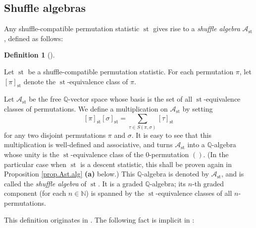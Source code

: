 \documentclass[numbers=enddot,12pt,final,onecolumn,notitlepage]{scrartcl}%
\theoremstyle{definition}
\newtheorem{defi}[theo]{Definition}
\newenvironment{definition}[1][]
{\begin{defi}[#1]\begin{leftbar}}
{\end{leftbar}\end{defi}}
\newenvironment{verlong}{}{}
\let\sumnonlimits\sum
\renewcommand{\sum}{\sumnonlimits\limits}
\begin{document}
\subsection{Shuffle algebras}

Any shuffle-compatible permutation statistic $\operatorname*{st}$ gives rise
to a \textit{shuffle algebra} $\mathcal{A}_{\operatorname*{st}}$, defined as follows:

\begin{definition}
\label{def.Ast}Let $\operatorname*{st}$ be a shuffle-compatible permutation
statistic. For each permutation $\pi$, let $\left[  \pi\right]
_{\operatorname*{st}}$ denote the $\operatorname*{st}$-equivalence class of
$\pi$.

Let $\mathcal{A}_{\operatorname*{st}}$ be the free $\mathbb{Q}$-vector space
whose basis is the set of all $\operatorname*{st}$-equivalence classes of
permutations. We define a multiplication on $\mathcal{A}_{\operatorname*{st}}$
by setting%
\[
\left[  \pi\right]  _{\operatorname*{st}}\left[  \sigma\right]
_{\operatorname*{st}}=\sum_{\tau\in S\left(  \pi,\sigma\right)  }\left[
\tau\right]  _{\operatorname*{st}}%
\]
for any two disjoint permutations $\pi$ and $\sigma$. It is easy to see that
this multiplication is well-defined and associative, and turns $\mathcal{A}%
_{\operatorname*{st}}$ into a $\mathbb{Q}$-algebra whose unity is the
$\operatorname*{st}$-equivalence class of the $0$-permutation
$\left( \right)$.
\begin{verlong}
(In the
particular case when $\operatorname*{st}$ is a descent statistic, this shall
be proven again in Proposition \ref{prop.Ast.alg} \textbf{(a)} below.)
\end{verlong}
This
$\mathbb{Q}$-algebra is denoted by $\mathcal{A}_{\operatorname*{st}}$, and is
called the \textit{shuffle algebra} of $\operatorname*{st}$. It is a graded
$\mathbb{Q}$-algebra; its $n$-th graded component (for each $n\in\mathbb{N}$)
is spanned by the $\operatorname*{st}$-equivalence classes of all $n$-permutations.
\end{definition}

This definition originates in \cite[\S 3.1]{part1}.
The following fact is implicit in \cite{part1}:
\end{document}

